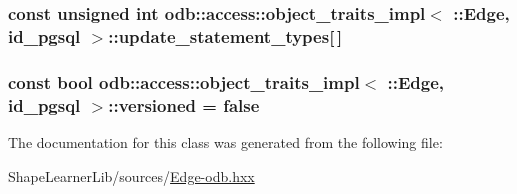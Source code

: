 \subsubsection[{update\+\_\+statement\+\_\+types}]{\setlength{\rightskip}{0pt plus 5cm}const unsigned int odb\+::access\+::object\+\_\+traits\+\_\+impl$<$ \+::{\bf Edge}, id\+\_\+pgsql $>$\+::update\+\_\+statement\+\_\+types\mbox{[}$\,$\mbox{]}\hspace{0.3cm}{\ttfamily [static]}}\label{classodb_1_1access_1_1object__traits__impl_3_01_1_1_edge_00_01id__pgsql_01_4_a153e1609cdb9b6a79192d81db412d15d}
\hypertarget{classodb_1_1access_1_1object__traits__impl_3_01_1_1_edge_00_01id__pgsql_01_4_a01011a6335bfa0796caad6e584a03dec}{}
\subsubsection[{versioned}]{\setlength{\rightskip}{0pt plus 5cm}const {\bf bool} odb\+::access\+::object\+\_\+traits\+\_\+impl$<$ \+::{\bf Edge}, id\+\_\+pgsql $>$\+::versioned = false\hspace{0.3cm}{\ttfamily [static]}}\label{classodb_1_1access_1_1object__traits__impl_3_01_1_1_edge_00_01id__pgsql_01_4_a01011a6335bfa0796caad6e584a03dec}


The documentation for this class was generated from the following file\+:\begin{DoxyCompactItemize}
\item 
Shape\+Learner\+Lib/sources/\hyperlink{_edge-odb_8hxx}{Edge-\/odb.\+hxx}\end{DoxyCompactItemize}
